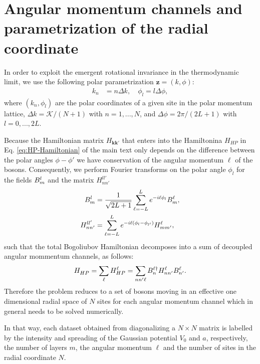 \documentclass[english,aps,prd,nofootinbib,twocolumn]{revtex4-1}
\begin{document}
\section{Angular momentum channels and parametrization of the radial coordinate}
In order to exploit the emergent rotational invariance in the thermodynamic limit, we use the following polar parametrization $\mathbf{z}=(k,\phi)$:
\begin{equation}
\label{eq:Tangential-radius}
\begin{split}
    k_{n} &= n\Delta k,
    \quad \phi_{l} = l\Delta \phi,
\end{split}
\end{equation}
where $(k_n,\phi_l)$ are the polar coordinates of a given site in the polar momentum lattice, $\Delta k = \mathcal{K}/(N+1)$ with $n={1,...,N}$, and $\Delta \phi = 2\pi/(2L+1)$ with $l={0,...,2L}$. 

Because the Hamiltonian matrix $H_{\mathbf{k k'}}$ that enters into the Hamiltonina $H_{HP}$ in Eq. \eqref{eq:HP-Hamiltonian} of the main text only depends on the difference between the polar angles $\phi-\phi'$ we have conservation of the angular momentum $\ell$ of the bosons. Consequently, we perform Fourier transforms on the polar angle $\phi_{l}$ for the fields $B_{m}^{l\textcolor{white}{\dagger}}$ and the matrix $H_{nn'}^{ll'}$
\begin{equation}
\begin{split}
B_{m}^{l\textcolor{white}{\dagger}} &= 
\frac{1}{\sqrt{2L+1}}\sum_{\ell=-L}^{L}
e^{-i \ell \phi_{l}}B_{m}^{\ell} ,
\\
H_{nn'}^{ll'} &= \sum_{\ell=-L}^{L}
e^{-i \ell (\phi_{l }-\phi_{l'})}
H_{mm'}^{\ell},
\end{split}
\end{equation}
such that the total Bogoliubov Hamiltonian decomposes into a sum of decoupled angular mommentum channels, as follows:
\begin{equation}
H_{HP}^{\textcolor{white}{\ell}} = \sum_{\ell}
H_{HP}^{\ell} = 
\sum_{nn'\ell}
B_{n  }^{\ell\textcolor{black}{\dagger}}
H_{nn'}^{\ell}
B_{n' }^{\ell}.
\end{equation}
Therefore the problem reduces to a set of bosons moving in an effective one dimensional radial space of $N$ sites for each angular momentum channel which in general needs to be solved numerically.	

In that way, each dataset obtained from diagonalizing a $N\times N$ matrix is labelled by the intensity and spreading of the Gaussian potential $V_{0}$ and $a$, respectively, the number of layers $m$, the angular momentum $\ell$ and the number of sites in the radial coordinate $N$.
\end{document}

